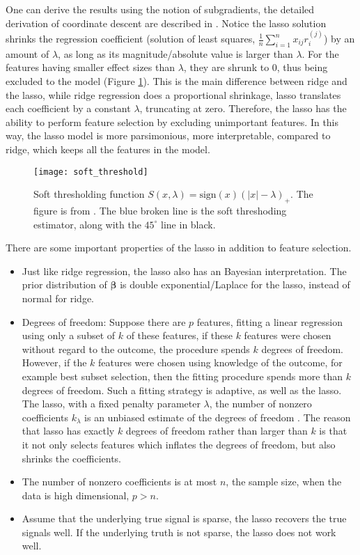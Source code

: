 One can derive the results using the notion of subgradients, the detailed derivation of coordinate descent are described in \cite{friedman2007pathwise}. Notice the lasso solution shrinks the regression coefficient (solution of least squares, $\frac{1}{n}\sum_{i=1}^{n}x_{ij}r_i^{(j)}$) by an amount of $\lambda$, as long as its magnitude/absolute value is larger than $\lambda$. For the features having smaller effect sizes than $\lambda$, they are shrunk to 0, thus being excluded to the model (Figure \ref{fig:soft_threshold}). This is the main difference between ridge and the lasso, while ridge regression does a proportional shrinkage, lasso translates each coefficient by a constant $\lambda$, truncating at zero. Therefore, the lasso has the ability to perform feature selection by excluding unimportant features. In this way, the lasso model is more parsimonious, more interpretable, compared to ridge, which keeps all the features in the model.
\begin{figure}[tbh]
  \centering
  \texttt{[image: soft\_threshold]}
  \caption[Soft thresholding function $S(x, \lambda)=\text{sign}(x)(|x|-\lambda)_+$]{
    Soft thresholding function $S(x, \lambda)=\text{sign}(x)(|x|-\lambda)_+$. The figure is from \cite{hastie2019statistical}. The blue broken line is the soft threshoding estimator, along with the $45^{\circ}$ line in black.
  }
  \label{fig:soft_threshold}
\end{figure}

There are some important properties of the lasso in addition to feature selection.
\begin{itemize}
    \item Just like ridge regression, the lasso also has an Bayesian interpretation. The prior distribution of $\bm{\beta}$ is double exponential/Laplace for the lasso, instead of normal for ridge.
    \item Degrees of freedom: Suppose there are $p$ features, fitting a linear regression using only a subset of $k$ of these features, if these $k$ features were chosen without regard to the outcome, the procedure spends $k$ degrees of freedom. However, if the $k$ features were chosen using knowledge of the outcome, for example best subset selection, then the fitting procedure spends more than $k$ degrees of freedom. Such a fitting strategy is adaptive, as well as the lasso. The lasso, with a fixed penalty parameter $\lambda$, the number of nonzero coefficients $k_\lambda$ is an unbiased estimate of the degrees of freedom \citep{zou2007degrees, tibshirani2012degrees}. The reason that lasso has exactly $k$ degrees of freedom rather than larger than $k$ is that it not only selects features which inflates the degrees of freedom, but also shrinks the coefficients. 
    \item The number of nonzero coefficients is at most $n$, the sample size, when the data is high dimensional, $p>n$.
    \item Assume that the underlying true signal is sparse, the lasso recovers the true signals well. If the underlying truth is not sparse, the lasso does not work well. 
\end{itemize}

